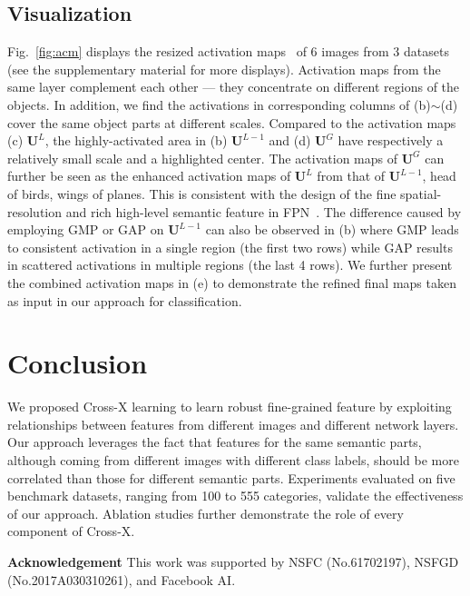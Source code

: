 \documentclass[10pt,twocolumn,letterpaper]{article}
\begin{document}
\subsection{Visualization}
\label{sec:vis}
Fig.~\ref{fig:acm} displays the resized activation maps~\cite{cam@torralba} of 6 images from 3 datasets (see the supplementary material for more displays). Activation maps from the same layer complement each other --- they concentrate on different regions of the objects. In addition, we find the activations in corresponding columns of (b)$\sim$(d) cover the same object parts at different scales. Compared to the activation maps (c) $\mathbf{U}^L$, the highly-activated area in (b) $\mathbf{U}^{L-1}$ and (d) $\mathbf{U}^G$ have respectively a relatively small scale and a highlighted center. The activation maps of $\mathbf{U}^G$ can further be seen as the enhanced activation maps of $\mathbf{U}^L$ from that of $\mathbf{U}^{L-1}$, \eg head of birds, wings of planes.
This is consistent with the design of the fine spatial-resolution and rich high-level semantic feature in FPN~\cite{fpn17kaiming}. The difference caused by employing GMP or GAP on $\mathbf{U}^{L-1}$ can also be observed in (b) where GMP leads to consistent activation in a single region (the first two rows) while GAP results in scattered activations in multiple regions (the last 4 rows). 
We further present the combined activation maps in (e) to demonstrate the refined final maps taken as input in our approach for classification. 


\section{Conclusion}
\label{sec:clus}
We proposed Cross-X learning to learn robust fine-grained feature by exploiting relationships between features from different images and different network layers. Our approach leverages the fact that
features for the same semantic parts, although coming from different images with different class labels, should be more correlated than those for different semantic parts. Experiments evaluated on five benchmark datasets, ranging from 100 to 555 categories, validate the effectiveness of our approach. Ablation studies further demonstrate the role of every component of Cross-X.

\noindent\textbf{Acknowledgement}
This work was supported by NSFC (No.61702197), NSFGD (No.2017A030310261), and Facebook AI.

{\small


}
\end{document}
